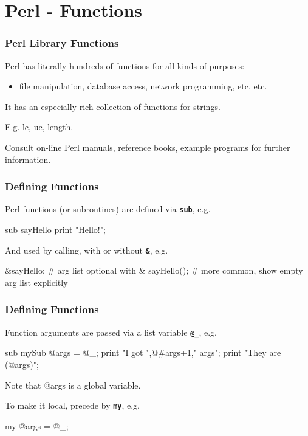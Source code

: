 

\section{Perl - Functions}


\begin{frame}
\frametitle{Perl Library Functions}
Perl has literally hundreds of functions for all kinds of purposes:
\begin{itemize}
\item  file manipulation, database access, network programming, etc. etc.
\end{itemize}
It has an especially rich collection of functions for strings.

E.g. lc, uc, length.

Consult on-line Perl manuals, reference books, example programs for further information.
\end{frame}

\begin{frame}
\frametitle{Defining Functions}
Perl functions (or subroutines) are defined via \textbf{\tt{sub}}, e.g.
\begin{perl}
sub sayHello {
    print "Hello!\n";
}
\end{perl}


And used by calling, with or without \textbf{\tt{\&}}, e.g.
\begin{perl}
&sayHello;  # arg list optional with &
sayHello(); # more common, show empty arg list explicitly
\end{perl}

\end{frame}

\begin{frame}
\frametitle{Defining Functions}
Function arguments are passed via a list variable \textbf{\tt{@\_}}, e.g.
\begin{perl}
sub mySub {
    @args = @_;
    print "I got ",@#args+1," args\n";
    print "They are (@args)\n";
}
\end{perl}


Note that @args is a global variable.

To make it local, precede by \textbf{\tt{my}}, e.g.
\begin{perl}
        my @args = @_;
\end{perl}

\end{frame}


